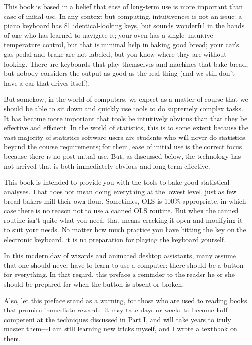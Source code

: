
This book is based in a belief that ease of long-term use is more
important than ease of initial use. In any context but computing,
intuitiveness is not an issue: a piano keyboard has 81 identical-looking
keys, but sounds wonderful in the hands of one who has learned to
navigate it; your oven has a single, intuitive temperature control,
but that is minimal help in baking good bread; your car's gas pedal and
brake are not labeled, but you know where they are without looking. There
are keyboards that play themselves and machines that bake bread, but
nobody considers the output as good as the real thing (and we still
don't have a car that drives itself).

But somehow, in the world of computers, we expect as a matter of course
that we should be able to sit down and quickly use tools to do supremely
complex tasks. It has become more important that tools be intuitively
obvious than that they be effective and efficient. In the world of
statistics, this is to some extent because the vast majority of
statistics software users are students who will never do statistics
beyond the course requirements; for them, ease of initial use is the
correct focus because there is no post-initial use. But, as discussed
below, the technology has not arrived that is both immediately obvious
and long-term effective. 

This book is intended to provide you with the tools to bake good
statistical analyses. That does not mean doing everything at the lowest
level, just as few bread bakers mill their own flour. Sometimes, OLS is
100\% appropriate, in which case there is no reason not to use a canned
OLS routine. But when the canned routine isn't quite what you need, that
means cracking it open and modifying it to suit your needs.  No matter
how much practice you have hitting the 
key on the electronic keyboard, it is no preparation for playing the
keyboard yourself.

In this
modern day of wizards and animated desktop assistants, many assume 
that one should never have to learn to use a computer: there should be
a button for everything. In that regard, this preface a reminder to the
reader he or she should be prepared for when the button is absent
or broken. 

Also, let this preface stand as a warning, for those who are used to 
reading books that promise immediate rewards: it may take days or weeks
to become half-competent at the techniques discussed in Part I, and will
take years to truly master them---I am still learning new tricks myself,
and I wrote a textbook on them.  

